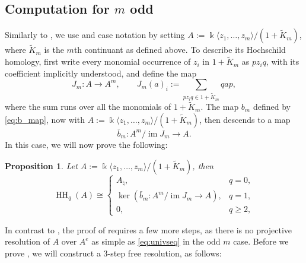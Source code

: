 \documentclass[11pt]{article}
\newtheorem{proposition}[theorem]{Proposition}
\newcommand{\kk}{\Bbbk}
\newcommand{\HH}{\operatorname{HH}}
\newcommand{\im}{\operatorname{im}}
\newcommand{\natq}{\natural}
\begin{document}
\subsection{ Computation for $m$ odd}\label{ssec:HH_m_odd} Similarly to , we use  and ease notation by setting $A:=\kk\langle z_1,\ldots,z_m\rangle/(1+\widetilde K_m)$, where $\widetilde K_m$ is the $m$th continuant as defined above. To describe its Hochschild homology, first write every monomial occurrence of $z_i$ in $1+\widetilde K_m$ as $p z_iq$, with its coefficient implicitly understood, and define the map
\begin{equation}\label{eq:Jm_map}
J_m:A\longrightarrow A^m,\qquad J_m(a)_i:=\sum_{p z_iq\in 1+\widetilde K_m}qap,
\end{equation}
where the sum runs over all the monomials of $1+\widetilde K_m$. The map $b_m$ defined by \eqref{eq:b_map}, now with $A:=\kk\langle z_1,\ldots,z_m\rangle/(1+\widetilde K_m)$, then descends to a map
$$\bar b_m:A^m/\im J_m\to A.$$
In this case, we will now prove the following:

\begin{proposition}\label{prop:HH_odd_case} Let $A:=\kk\langle z_1,\ldots,z_m\rangle/(1+\widetilde K_m)$, then
\[
 \HH_q(A)\cong
 \begin{cases}
 A_\natq,&q=0,\\
 \ker\!\left(\bar b_m:A^m/\im J_m\to A\right),&q=1,\\
 0,&q\ge2,
 \end{cases}
\]
\end{proposition}

In contrast to , the proof of  requires a few more steps, as there is no projective resolution of $A$ over $A^e$ as simple as \eqref{eq:univseq} in the odd $m$ case. Before we prove , we will construct a 3-step free resolution, as follows:
\end{document}

